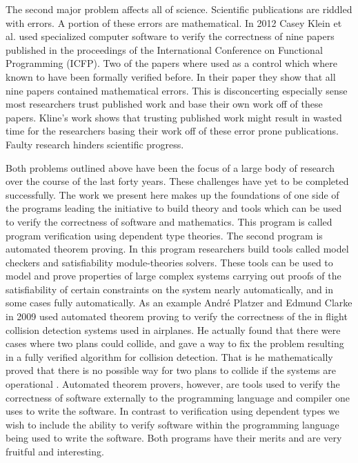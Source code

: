 \documentclass{article}
\begin{document}
The second major problem affects all of science.  Scientific
publications are riddled with errors.  A portion of these errors are
mathematical.  In 2012 Casey Klein et al. used specialized computer
software to verify the correctness of nine papers published in the
proceedings of the International Conference on Functional Programming
(ICFP).  Two of the papers where used as a control which where known
to have been formally verified before.  In their paper
\cite{Klein:2012} they show that all nine papers contained
mathematical errors.  This is disconcerting especially sense most
researchers trust published work and base their own work off of these
papers.  Kline's work shows that trusting published work might result
in wasted time for the researchers basing their work off of these
error prone publications.  Faulty research hinders scientific
progress.

Both problems outlined above have been the focus of a large body of
research over the course of the last forty years.  These challenges
have yet to be completed successfully.  The work we present here makes
up the foundations of one side of the programs leading the initiative
to build theory and tools which can be used to verify the correctness
of software and mathematics.  This program is called program
verification using dependent type theories.  The second program is
automated theorem proving.  In this program researchers build tools
called model checkers and satisfiability module-theories solvers.
These tools can be used to model and prove properties of large complex
systems carrying out proofs of the satisfiability of certain
constraints on the system nearly automatically, and in some cases
fully automatically.  As an example Andr\'{e} Platzer and Edmund
Clarke in 2009 used automated theorem proving to verify the
correctness of the in flight collision detection systems used in
airplanes.  He actually found that there were cases where two plans
could collide, and gave a way to fix the problem resulting in a fully
verified algorithm for collision detection.  That is he mathematically
proved that there is no possible way for two plans to collide if the
systems are operational \cite{DBLP:conf/fm/PlatzerC09}.  Automated
theorem provers, however, are tools used to verify the correctness of
software externally to the programming language and compiler one uses
to write the software.  In contrast to verification using dependent
types we wish to include the ability to verify software within the
programming language being used to write the software. Both programs
have their merits and are very fruitful and interesting.
\end{document}
